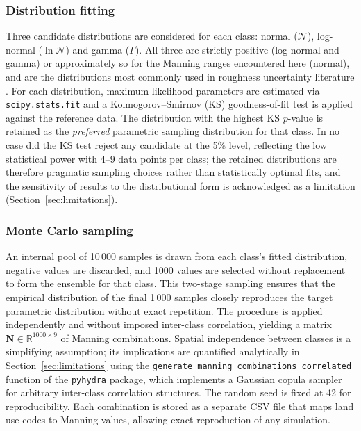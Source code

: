 \documentclass[review,12pt]{elsarticle}
\begin{document}
\subsubsection{Distribution fitting}
Three candidate distributions are considered for each class: normal
($\mathcal{N}$), log-normal ($\ln\mathcal{N}$) and gamma ($\Gamma$).
All three are strictly positive (log-normal and gamma) or approximately so
for the Manning ranges encountered here (normal), and are the distributions
most commonly used in roughness uncertainty literature
\citep{pappenberger2005, savage2016}.
For each distribution, maximum-likelihood parameters are estimated via
\texttt{scipy.stats.fit} and a Kolmogorov--Smirnov (KS) goodness-of-fit
test is applied against the reference data.
The distribution with the highest KS $p$-value is retained as the
\emph{preferred} parametric sampling distribution for that class.
In no case did the KS test reject any candidate at the 5\% level,
reflecting the low statistical power with 4--9 data points per class;
the retained distributions are therefore pragmatic sampling choices
rather than statistically optimal fits, and the sensitivity of results
to the distributional form is acknowledged as a limitation
(Section~\ref{sec:limitations}).

\subsubsection{Monte Carlo sampling}
An internal pool of 10\,000 samples is drawn from each class's fitted
distribution, negative values are discarded, and \num{1000} values are
selected without replacement to form the ensemble for that class.
This two-stage sampling ensures that the empirical distribution of the final
1\,000 samples closely reproduces the target parametric distribution
without exact repetition.
The procedure is applied independently and without imposed inter-class
correlation, yielding a matrix $\mathbf{N} \in \mathbb{R}^{1000 \times 9}$
of Manning combinations.
Spatial independence between classes is a simplifying assumption; its
implications are quantified analytically in Section~\ref{sec:limitations}
using the \texttt{generate\_manning\_combinations\_correlated} function of the
\texttt{pyhydra} package, which implements a Gaussian copula sampler for
arbitrary inter-class correlation structures.
The random seed is fixed at 42 for reproducibility.
Each combination is stored as a separate CSV file that maps land use codes
to Manning values, allowing exact reproduction of any simulation.
\end{document}
